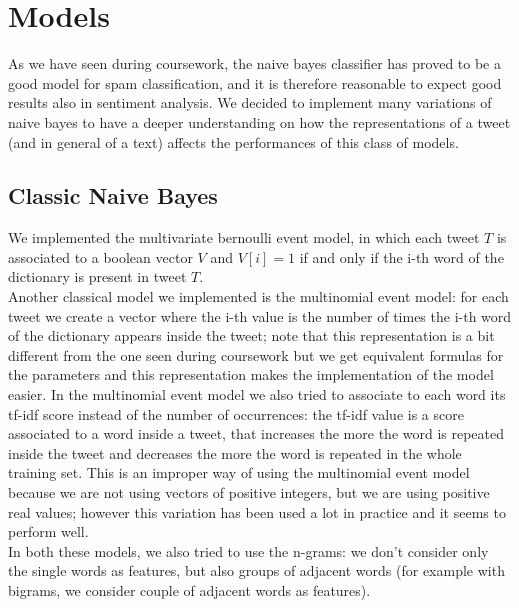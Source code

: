 \section*{Models}
As we have seen during coursework, the naive bayes classifier has proved to be a good model for spam classification, and it is therefore reasonable to expect good results also in sentiment analysis. We decided to implement many variations of naive bayes to have a deeper understanding on how the representations of a tweet (and in general of a text) affects the performances of this class of models.
\subsection*{Classic Naive Bayes}
 We implemented the multivariate bernoulli event model, in which each tweet $T$ is associated to a boolean vector $V$ and $V[i]=1$ if and only if the i-th word of the dictionary is present in tweet $T$. \\
Another classical model we implemented is the multinomial event model: for each tweet we create a vector where the i-th value is the number of times the i-th word of the dictionary appears inside the tweet; note that this representation is a bit different from the one seen during coursework but we get equivalent formulas for the parameters and this representation makes the implementation of the model easier. In the multinomial event model we also tried to associate to each word its tf-idf score instead of the number of occurrences: the tf-idf value is a score associated to a word inside a tweet, that increases the more the word is repeated inside the tweet and decreases the more the word is repeated in the whole training set. This is an improper way of using the multinomial event model because we are not using vectors of positive integers, but we are using positive real values; however this variation has been used a lot in practice and it seems to perform well.\\
In both these models, we also tried to use the n-grams: we don't consider only the single words as features, but also groups of adjacent words (for example with bigrams, we consider couple of adjacent words as features).

